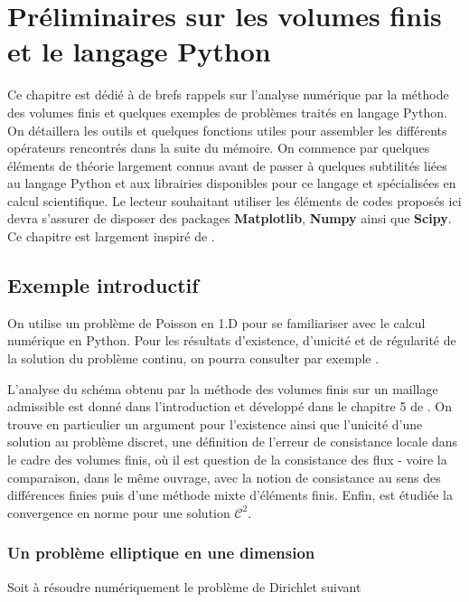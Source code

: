 \chapter{Préliminaires sur les volumes finis et le langage Python}

\noindent Ce chapitre est dédié à de brefs rappels sur l'analyse numérique par la méthode des volumes finis et quelques exemples de problèmes traités en langage Python. On détaillera les outils et quelques fonctions utiles pour assembler les différents opérateurs rencontrés dans la suite du mémoire. On commence par quelques éléments de théorie largement connus avant de passer à quelques subtilités liées au langage Python et aux librairies disponibles pour ce langage et spécialisées en calcul scientifique. Le lecteur souhaitant utiliser les éléments de codes proposés ici devra s'assurer de disposer des packages \textbf{Matplotlib}, \textbf{Numpy} ainsi que \textbf{Scipy}. Ce chapitre est largement inspiré de \cite{eymard:hal-02100732}.

\section{Exemple introductif}

On utilise un problème de Poisson en 1.D pour se familiariser avec le calcul numérique en Python. Pour les résultats d'existence, d'unicité et de régularité de la solution du problème continu, on pourra consulter par exemple \cite{brezis1983}. 

L'analyse du schéma obtenu par la méthode des volumes finis sur un maillage admissible est donné dans l'introduction et développé dans le chapitre 5 de \cite{eymard:hal-02100732}. On trouve en particulier un argument pour l'existence ainsi que l'unicité d'une solution au problème discret, une définition de l'erreur de consistance locale dans le cadre des volumes finis, où il est question de la consistance des flux - voire la comparaison, dans le même ouvrage, avec la notion de consistance au sens des différences finies puis d'une méthode mixte d'éléments finis. Enfin, est étudiée la convergence en norme pour une solution $\mathcal{C}^{2}$.

\subsection*{Un problème elliptique en une dimension} Soit à résoudre numériquement le problème de Dirichlet suivant
 
